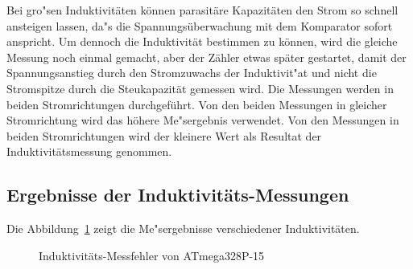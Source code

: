 Bei gro"sen Induktivit\"aten k\"onnen parasit\"are Kapazit\"aten den Strom so schnell ansteigen lassen, da"s
die Spannungs\"uberwachung mit dem Komparator sofort anspricht. Um dennoch die Induktivit\"at bestimmen zu
k\"onnen, wird die gleiche Messung noch einmal gemacht, aber der Z\"ahler etwas sp\"ater gestartet, damit
der Spannungsanstieg durch den Stromzuwachs der Induktivit"at und nicht die Stromspitze durch die
Steukapazit\"at gemessen wird.
Die Messungen werden in beiden Stromrichtungen durchgef\"uhrt.
Von den beiden Messungen in gleicher Stromrichtung wird das h\"ohere Me"sergebnis verwendet.
Von den Messungen in beiden Stromrichtungen wird der kleinere Wert als Resultat der Induktivit\"atsmessung genommen.

\subsection{Ergebnisse der Induktivit\"ats-Messungen}
Die Abbildung~\ref{fig:Induct328p} zeigt die Me"sergebnisse verschiedener Induktivit\"aten.

\begin{figure}[H]
\centering

\caption{Induktivit\"ats-Messfehler von ATmega328P-15}
\label{fig:Induct328p}
\end{figure}
